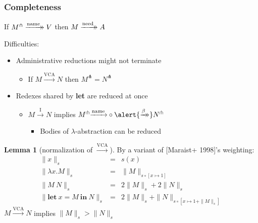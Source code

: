 \documentclass[dvipdfmx,cjk,xcolor=dvipsnames,envcountsect,notheorems,12pt]{beamer}
\theoremstyle{definition}
\newtheorem{lemma}{Lemma}
\newcommand{\xtwoheadrightarrow}[2][]{%
  \xrightarrow[#1]{#2}\mathrel{\mkern-14mu}\rightarrow
}
\newcommand{\LET}[3]{\mathbf{let}~#1=#2~\mathbf{in}~#3}
\newcommand{\EXPANDLET}[1]{#1^\pitchfork}
\newcommand{\SIZE}[2]{\parallel #1 \parallel_{#2}}
\newcommand{\CALLBYNEEDI}{\xrightarrow{\mathrm{I}}}
\newcommand{\CALLBYNEEDVCA}{\xrightarrow{\mathrm{VCA}}}
\newcommand{\CALLBYNAME}{\xrightarrow{\mathrm{name}}}
\newcommand{\RTCLOSFULLBETA}{\xtwoheadrightarrow{\beta}}
\newcommand{\RTCLOSCALLBYNEED}{\xtwoheadrightarrow{\mathrm{need}}}
\newcommand{\RTCLOSCALLBYNAME}{\xtwoheadrightarrow{\mathrm{name}}}
\begin{document}
\begin{frame}
	\frametitle{Completeness}
	\Large
	\vspace{-7mm}
	\begin{center}
		\begin{minipage}{.65\linewidth}
			\begin{block}{}
				If $\EXPANDLET{M}\RTCLOSCALLBYNAME V$ then $M\RTCLOSCALLBYNEED A$ \\
			\end{block}
		\end{minipage}
	\end{center}
	\vfill
	Difficulties:
	\begin{itemize}
		\item Administrative reductions might not terminate
			\begin{itemize}
				\item If $M\CALLBYNEEDVCA N$ then $\EXPANDLET{M}=\EXPANDLET{N}$
			\end{itemize}
		\item Redexes shared by \textbf{let} are reduced at once
			\begin{itemize}
				\item $M\CALLBYNEEDI N$ implies $\EXPANDLET{M}{\CALLBYNAME}\circ{\alert{\RTCLOSFULLBETA}}\EXPANDLET{N}$
					\begin{itemize}
						\item Bodies of $\lambda$-abstraction can be reduced
					\end{itemize}
			\end{itemize}
	\end{itemize}
\end{frame}

\begin{frame}
	\Large
	\begin{lemma}[normalization of $\CALLBYNEEDVCA$]
		By a variant of {[Maraist+ 1998]}'s weighting:
		{\normalsize \[ \begin{array}{rcl}
		\SIZE{x}{s} & = & s(x) \\
		\SIZE{\lambda x. M}{s} & = & \SIZE{M}{s \circ [x \mapsto 1]} \\
		\SIZE{M~N}{s} & = & 2\SIZE{M}{s}+2\SIZE{N}{s} \\
		\SIZE{\LET{x}{M}{N}}{s} & = & 2\SIZE{M}{s}+\SIZE{N}{s \circ [x \mapsto 1+\SIZE{M}{s}]}
		\end{array} \]}
		$M\CALLBYNEEDVCA N$ implies $\SIZE{M}{s}>\SIZE{N}{s}$
	\end{lemma}
\end{frame}
\end{document}
